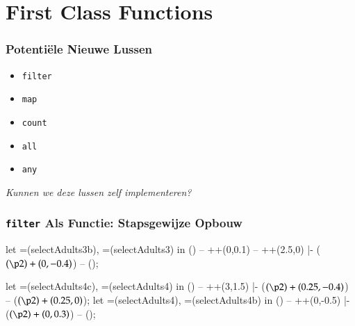 \section{First Class Functions}

\frame{\tableofcontents[currentsection]}

\begin{frame}
  \frametitle{Potenti\"ele Nieuwe Lussen}
  \begin{itemize}
    \item \texttt{filter}
    \item \texttt{map}
    \item \texttt{count}
    \item \texttt{all}
    \item \texttt{any}
  \end{itemize}
  \begin{center} \itshape
    Kunnen we  deze lussen zelf implementeren?
  \end{center}
\end{frame}

\begin{frame}
  \frametitle{\texttt{filter} Als Functie: Stapsgewijze Opbouw}
  \begin{overprint}

      let =(selectAdults3b), =(selectAdults3) in () -- ++(0,0.1) -- ++(2.5,0) |- ($ (\p2) + (0,-0.4) $) -- ();

      let =(selectAdults4c), =(selectAdults4) in () -- ++(3,1.5) |- ($ (\p2) + (0.25,-0.4) $) -- ($ (\p2) + (0.25,0) $);
      let =(selectAdults4), =(selectAdults4b) in () -- ++(0,-0.5) |- ($ (\p2) + (0,0.3) $) -- ();
  \end{overprint}
\end{frame}

